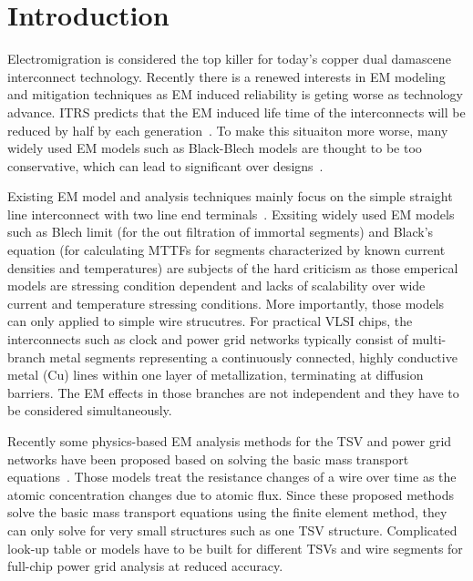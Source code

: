 \section{Introduction}
\label{sec:intro}

Electromigration is considered the top killer for today's copper dual
damascene interconnect technology. Recently there is a renewed
interests in EM modeling and mitigation techniques as EM induced
reliability is geting worse as technology advance.  ITRS predicts that
the EM induced life time of the interconnects will be reduced by half
by each generation~\cite{ITRS}. To make this situaiton more worse,
many widely used EM models such as Black-Blech models are thought to
be too conservative, which can lead to significant over
designs~\cite{Bailey:semieng}.

Existing EM model and analysis techniques mainly focus on the simple
straight line interconnect with two line end
terminals~\cite{deOrio:2010}.  Exsiting widely used EM models such as
Blech limit \cite{Blech:1976ko} (for the out filtration of immortal
segments) and Black's equation \cite{Black:1969fc} (for calculating
MTTFs for segments characterized by known current densities and
temperatures) are subjects of the hard criticism
\cite{Ohring:1998uj}\cite{Lloyd:2008je}\cite{Hauschildt:2013cv} as
those emperical models are stressing condition dependent and lacks of
scalability over wide current and temperature stressing
conditions. More importantly, those models can only applied to simple
wire strucutres.  For practical VLSI chips, the interconnects such as
clock and power grid networks typically consist of multi-branch metal
segments representing a continuously connected, highly conductive
metal (Cu) lines within one layer of metallization, terminating at
diffusion barriers. The EM effects in those branches are not
independent and they have to be considered simultaneously.

Recently some physics-based EM analysis methods for the
TSV and power grid networks have been proposed based on solving the
basic mass transport
equations~\cite{Pak:2011cx,Pathak:2011kz,Zhao:2013cv,Pak:2013bh}.
Those models treat the resistance changes of a wire over time as the
atomic concentration changes due to atomic flux. Since these proposed
methods solve the basic mass transport equations using the finite
element method, they can only solve for very small structures such as
one TSV structure. Complicated look-up table or models have to be
built for different TSVs and wire segments for full-chip power grid
analysis at reduced accuracy.

